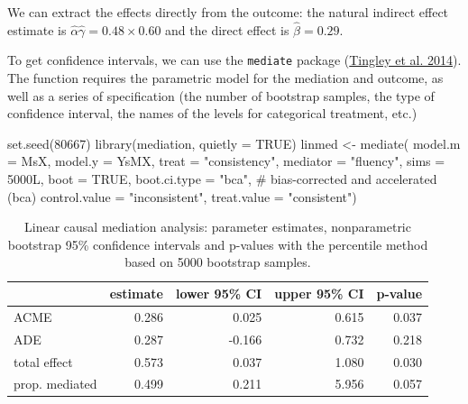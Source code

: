 \documentclass[
  11pt,
  letterpaper,
]{scrbook}
\newenvironment{Shaded}{\begin{snugshade}}{\end{snugshade}}
\newcommand{\AttributeTok}[1]{\textcolor[rgb]{0.40,0.45,0.13}{#1}}
\newcommand{\CommentTok}[1]{\textcolor[rgb]{0.37,0.37,0.37}{#1}}
\newcommand{\ConstantTok}[1]{\textcolor[rgb]{0.56,0.35,0.01}{#1}}
\newcommand{\DecValTok}[1]{\textcolor[rgb]{0.68,0.00,0.00}{#1}}
\newcommand{\FunctionTok}[1]{\textcolor[rgb]{0.28,0.35,0.67}{#1}}
\newcommand{\NormalTok}[1]{\textcolor[rgb]{0.00,0.23,0.31}{#1}}
\newcommand{\OtherTok}[1]{\textcolor[rgb]{0.00,0.23,0.31}{#1}}
\newcommand{\StringTok}[1]{\textcolor[rgb]{0.13,0.47,0.30}{#1}}
\theoremstyle{definition}
\theoremstyle{remark}
\begin{document}
We can extract the effects directly from the outcome: the natural
indirect effect estimate is
\(\widehat{\alpha}\widehat{\gamma} = 0.48 \times 0.60\) and the direct
effect is \(\widehat{\beta} = 0.29\).

To get confidence intervals, we can use the \texttt{mediate} package
(\protect\hyperlink{ref-mediationR}{Tingley et al. 2014}). The function
requires the parametric model for the mediation and outcome, as well as
a series of specification (the number of bootstrap samples, the type of
confidence interval, the names of the levels for categorical treatment,
etc.)

\begin{Shaded}
\begin{Highlighting}[]
\FunctionTok{set.seed}\NormalTok{(}\DecValTok{80667}\NormalTok{)}
\FunctionTok{library}\NormalTok{(mediation, }\AttributeTok{quietly =} \ConstantTok{TRUE}\NormalTok{)}
\NormalTok{linmed }\OtherTok{\textless{}{-}} \FunctionTok{mediate}\NormalTok{(}
  \AttributeTok{model.m =}\NormalTok{ MsX,}
  \AttributeTok{model.y =}\NormalTok{ YsMX,}
  \AttributeTok{treat =} \StringTok{"consistency"}\NormalTok{,}
  \AttributeTok{mediator =} \StringTok{"fluency"}\NormalTok{,}
  \AttributeTok{sims =}\NormalTok{ 5000L,}
  \AttributeTok{boot =} \ConstantTok{TRUE}\NormalTok{,}
  \AttributeTok{boot.ci.type =} \StringTok{"bca"}\NormalTok{, }\CommentTok{\# bias{-}corrected and accelerated (bca)}
  \AttributeTok{control.value =} \StringTok{"inconsistent"}\NormalTok{,}
  \AttributeTok{treat.value =} \StringTok{"consistent"}\NormalTok{)}
\end{Highlighting}
\end{Shaded}

\hypertarget{tbl-mediation}{}
\begin{table}
\caption{\label{tbl-mediation}Linear causal mediation analysis: parameter estimates, nonparametric
bootstrap 95\% confidence intervals and p-values with the percentile
method based on 5000 bootstrap samples. }\tabularnewline

\centering
\begin{tabular}{lrrrr}
\toprule
  & estimate & lower 95\% CI & upper 95\% CI & p-value\\
\midrule
ACME & 0.286 & 0.025 & 0.615 & 0.037\\
ADE & 0.287 & -0.166 & 0.732 & 0.218\\
total effect & 0.573 & 0.037 & 1.080 & 0.030\\
prop. mediated & 0.499 & 0.211 & 5.956 & 0.057\\
\bottomrule
\end{tabular}
\end{table}
\end{document}
